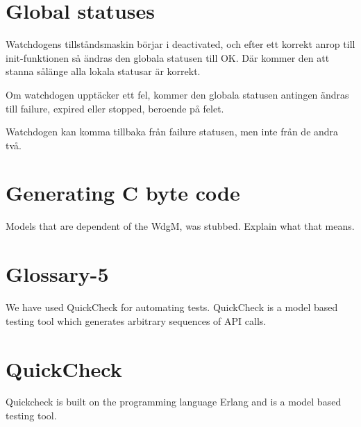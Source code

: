 \documentclass[a4paper]{article}
\begin{document}
\section{Global statuses}
Watchdogens tillståndsmaskin börjar i deactivated, och efter ett
korrekt anrop till init-funktionen så ändras den globala statusen till
OK.
Där kommer den att stanna sålänge alla lokala statusar är korrekt.

Om watchdogen upptäcker ett fel, kommer den globala statusen
antingen ändras till failure, expired eller stopped, beroende på
felet.

Watchdogen kan komma tillbaka från failure statusen, men inte från de
andra två.








\section{Generating C byte code}
Models that are dependent of the WdgM, was stubbed. Explain what that means.

\section{Glossary-5}
We have used QuickCheck for automating tests. QuickCheck is a model
based testing tool which generates arbitrary sequences of API calls.


\section{QuickCheck}
Quickcheck is built on the programming language Erlang and is a model based
testing tool.
\end{document}
